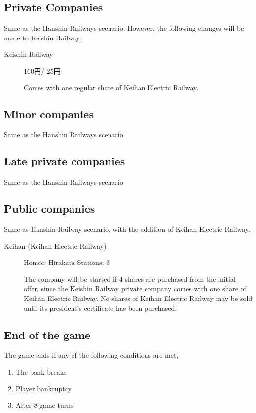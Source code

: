 \documentclass{article}
\begin{document}
\begin{CJK}{UTF8}{min}
\begin{multicols}{2}
\subsection{Private Companies}

Same as the Hanshin Railways scenario. However, the following changes will
be made to Keishin Railway.

\begin{description}
\item[Keishin Railway]  160円/ 25円

Comes with one regular share of Keihan Electric Railway.
\end{description}

\subsection{Minor companies}
Same as the Hanshin Railways scenario

\subsection{Late private companies}
Same as the Hanshin Railways scenario

\subsection{Public companies}
Same as Hanshin Railway scenario, with the addition of Keihan Electric Railway.

\begin{description}
\item[Keihan (Keihan Electric Railway)] \hfill

Homee: Hirakata \hfill Stations: 3

The company will be started if 4 shares are purchased from the initial
offer, since the Keishin Railway private company comes with one share of
Keihan Electric Railway. No shares of Keihan Electric Railway may be
sold until its president's certificate has been purchased.
\end{description}

\subsection{End of the game}
The game ends if any of the following conditions are met,
\begin{enumerate}
\item The bank breaks
\item Player bankruptcy
\item After 8 game turns
\end{enumerate}


\end{multicols}
\end{CJK}
\end{document}
